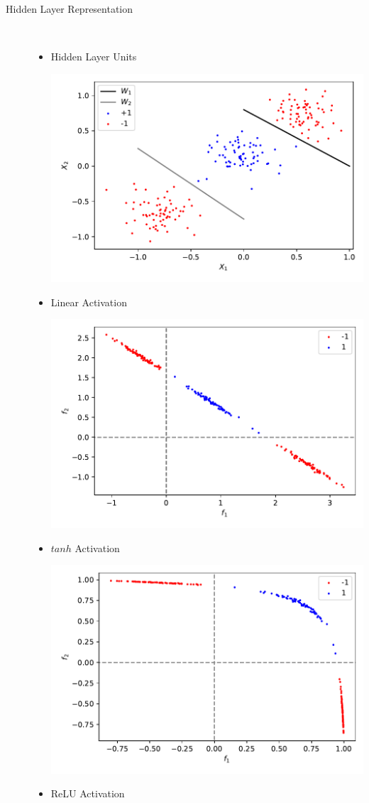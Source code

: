 \documentclass[10pt,landscape,a4paper]{article}
\begin{document}
\begin{multicols*}{3}
\begin{description}
	\item[Hidden Layer Representation] ~
	\begin{itemize}[noitemsep, topsep=0pt]
		\item Hidden Layer Units
		\begin{center}
			\includegraphics[width=0.6\columnwidth]{data.pdf}
		\end{center}
		\item Linear Activation
		\begin{center}
			\includegraphics[width=0.6\columnwidth]{linear.pdf}
		\end{center}
		\item $tanh$ Activation
		\begin{center}
			\includegraphics[width=0.6\columnwidth]{tanh.pdf}
		\end{center}
		\item ReLU Activation
		\begin{center}

\end{center}
\end{itemize}
\end{description}
\end{multicols*}
\end{document}
